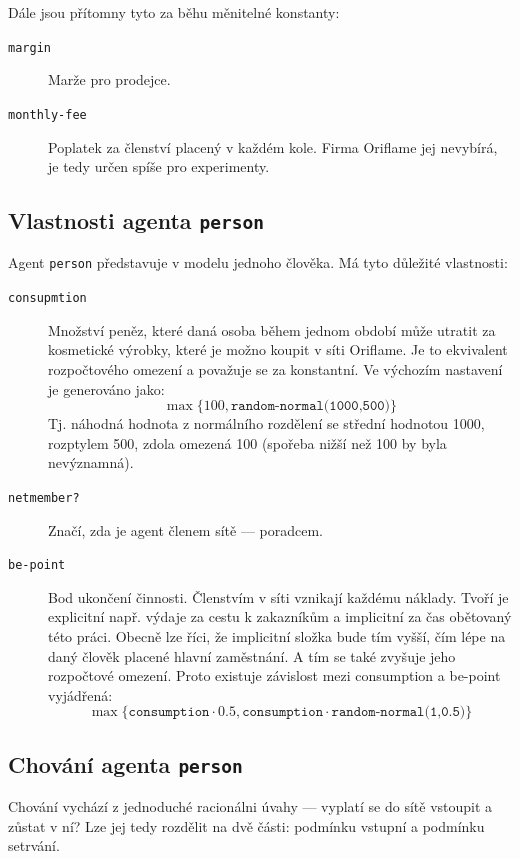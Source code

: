 \documentclass[a4wide,12pt]{report}
\begin{document}
Dále jsou přítomny tyto za běhu měnitelné konstanty:
\begin{description}
\item[\texttt{margin}] Marže pro prodejce.
\item[\texttt{monthly-fee}] Poplatek za členství placený v každém kole. Firma Oriflame jej nevybírá, je tedy určen spíše pro experimenty.
\end{description}
\subsection{Vlastnosti agenta \texttt{person}}
\label{sec:vl_agenta}
Agent \texttt{person} představuje v modelu jednoho člověka. Má tyto důležité vlastnosti:
\begin{description}
\item[\texttt{consupmtion}] Množství peněz, které daná osoba během jednom období může utratit za kosmetické výrobky, které je možno koupit v síti Oriflame. Je to ekvivalent rozpočtového omezení a považuje se za konstantní. Ve výchozím nastavení je generováno jako:
$$\max\{100,\texttt{random-normal(1000,500)}\}$$
Tj. náhodná hodnota z normálního rozdělení se střední hodnotou 1000, rozptylem 500, zdola omezená 100 (spořeba nižší než 100 by byla nevýznamná).
\item[\texttt{netmember?}] Značí, zda je agent členem sítě --- poradcem.
\item[\texttt{be-point}] Bod ukončení činnosti. Členstvím v síti vznikají každému náklady. Tvoří je explicitní např. výdaje za cestu k zakazníkům a implicitní za čas obětovaný této práci. Obecně lze říci, že implicitní složka bude tím vyšší, čím lépe na daný člověk placené hlavní zaměstnání. A tím se také zvyšuje jeho rozpočtové omezení. Proto existuje závislost mezi consumption a be-point vyjádřená:
$$\max\{\texttt{consumption}\cdot 0.5,\texttt{consumption}\cdot\texttt{random-normal(1,0.5)}\}$$
\end{description}
\subsection{Chování agenta \texttt{person}}
Chování vychází z jednoduché racionálni úvahy --- vyplatí se do sítě vstoupit a zůstat v ní? Lze jej tedy rozdělit na dvě části: podmínku vstupní a podmínku setrvání.
\end{document}
